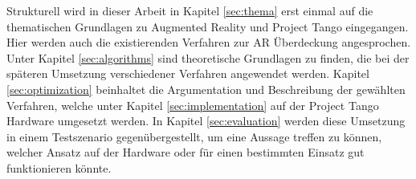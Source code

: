 Strukturell wird in dieser Arbeit in Kapitel \ref{sec:thema} erst einmal auf die thematischen Grundlagen zu Augmented Reality und Project Tango eingegangen. Hier werden auch die existierenden Verfahren zur AR Überdeckung angesprochen. Unter Kapitel \ref{sec:algorithms} sind theoretische Grundlagen zu finden, die bei der späteren Umsetzung verschiedener Verfahren angewendet werden. Kapitel \ref{sec:optimization} beinhaltet die Argumentation und Beschreibung der gewählten Verfahren, welche unter Kapitel \ref{sec:implementation} auf der Project Tango Hardware umgesetzt werden. In Kapitel \ref{sec:evaluation} werden diese Umsetzung in einem Testszenario gegenübergestellt, um eine Aussage treffen zu können, welcher Ansatz auf der Hardware oder für einen bestimmten Einsatz gut funktionieren könnte.


